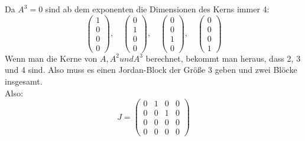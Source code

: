 \documentclass{article} %
\begin{document}
Da $A^3 = 0$ sind ab dem exponenten die Dimensionen des Kerns immer 4: \[
\begin{pmatrix}
1\\0\\0\\0
\end{pmatrix}, 
\quad \begin{pmatrix}
0\\1\\0\\0
\end{pmatrix},\quad \begin{pmatrix}
0\\0\\1\\0
\end{pmatrix}, \quad \begin{pmatrix}
0\\0\\0\\1
\end{pmatrix}
\]
Wenn man die Kerne von $A, A^2 und A^3$ berechnet, bekommt man heraus, dass 2, 3 und 4 sind. Also muss es einen Jordan-Block der Größe 3 geben und zwei Blöcke insgesamt. \\
Also: 
\[
J = \begin{pmatrix}
0&1&0&0\\
0&0&1&0\\
0&0&0&0\\
0&0&0&0
\end{pmatrix}
\]
\end{document}
